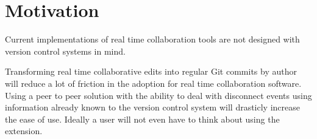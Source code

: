 \section{Motivation}

Current implementations of real time collaboration tools are not designed with version control systems in mind.

Transforming real time collaborative edits into regular Git commits by author will reduce a lot of friction in the adoption for real time collaboration software. Using a peer to peer solution with the ability to deal with disconnect events using information already known to the version control system will drasticly increase the ease of use. Ideally a user will not even have to think about using the extension.